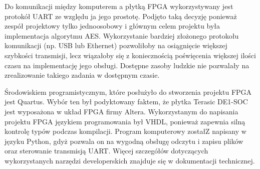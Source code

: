 Do komunikacji między komputerem a płytką FPGA wykorzystywany jest protokół UART ze względu ja jego prostotę. Podjęto taką decyzję ponieważ zespół projektowy tylko jednoosobowy i głównym celem projektu była implementacja algorytmu AES. Wykorzystanie bardziej złożonego protokołu komunikacji (np. USB lub Ethernet) pozwoliłoby na osiągnięcie większej szybkości transmisji, lecz wiązałoby się z koniecznością poświęcenia większej ilości czasu na implementację jego obsługi. Dostępne zasoby ludzkie nie pozwalały na zrealizowanie takiego zadania w dostępnym czasie.

Środowiskiem programistycznym, które posłużyło do stworzenia projektu FPGA jest Quartus. Wybór ten był podyktowany faktem, że płytka Terasic DE1-SOC jest wyposażona w układ FPGA firmy Altera. Wykorzystanym do napisania projektu FPGA językiem programowania był VHDL, ponieważ zapewnia silną kontrolę typów podczas kompilacji. Program komputerowy zostałZ napisany w języku Python, gdyż pozwala on na wygodną obsługę odczytu i zapisu plików oraz sterowanie transmisją UART. Więcej szczegółów dotyczących wykorzystanych narzędzi developerskich znajduje się w dokumentacji technicznej.


\newpage